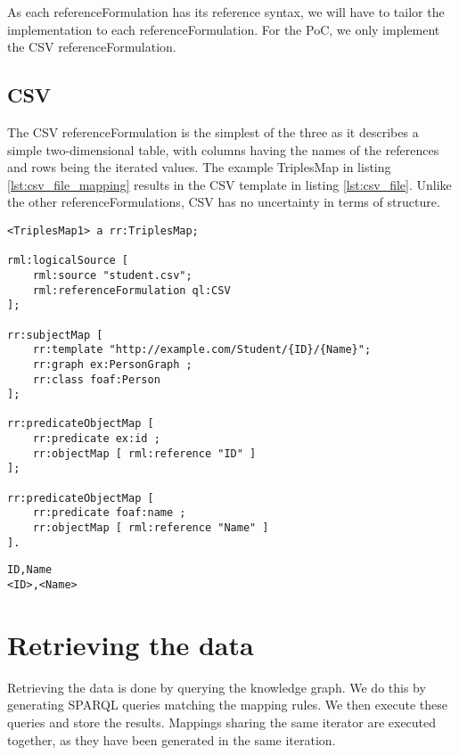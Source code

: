 As each referenceFormulation has its reference syntax, we will have to tailor the implementation to each referenceFormulation. For the PoC, we only implement the CSV referenceFormulation. 

\subsection{CSV}
\label{subsection:csv}
The CSV referenceFormulation is the simplest of the three as it describes a simple two-dimensional table, with columns having the names of the references and rows being the iterated values. The example TriplesMap in listing \ref{lst:csv_file_mapping} results in the CSV template in listing \ref{lst:csv_file}. Unlike the other referenceFormulations, CSV has no uncertainty in terms of structure.

\begin{lstlisting}[caption={Example mapping for a CSV file}, label={lst:csv_file_mapping}, captionpos=b, basicstyle=\small]
<TriplesMap1> a rr:TriplesMap;

rml:logicalSource [ 
    rml:source "student.csv";
    rml:referenceFormulation ql:CSV
];

rr:subjectMap [ 
    rr:template "http://example.com/Student/{ID}/{Name}";
    rr:graph ex:PersonGraph ;
    rr:class foaf:Person
];

rr:predicateObjectMap [ 
    rr:predicate ex:id ; 
    rr:objectMap [ rml:reference "ID" ]
];

rr:predicateObjectMap [ 
    rr:predicate foaf:name ; 
    rr:objectMap [ rml:reference "Name" ]
].
\end{lstlisting}

\begin{lstlisting}[caption={Example CSV template}, label={lst:csv_file}, captionpos=b, basicstyle=\small]
ID,Name
<ID>,<Name>
\end{lstlisting}

\section{Retrieving the data}
\label{section:retrieving_data}
Retrieving the data is done by querying the knowledge graph. We do this by generating SPARQL queries matching the mapping rules. We then execute these queries and store the results. Mappings sharing the same iterator are executed together, as they have been generated in the same iteration. 

